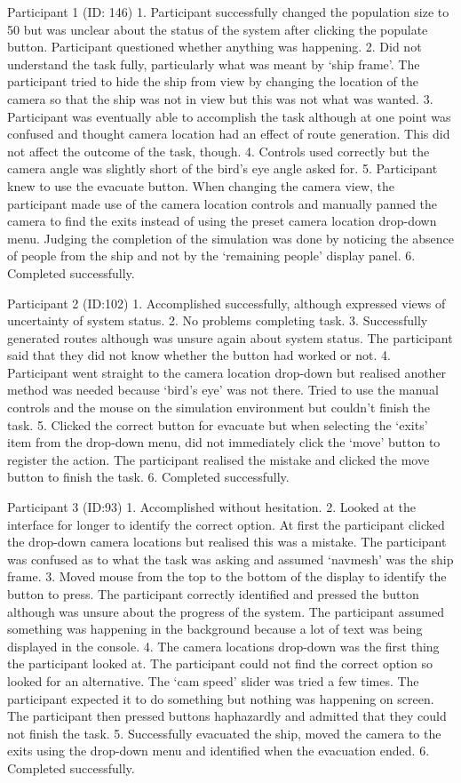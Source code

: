 \documentclass{article}
\begin{document}
Participant 1 (ID: 146)
1. Participant successfully changed the population size to 50 but was unclear about the status of the system after clicking the populate button. Participant questioned whether anything was happening.
2. Did not understand the task fully, particularly what was meant by ‘ship frame’. The participant tried to hide the ship from view by changing the location of the camera so that the ship was not in view but this was not what was wanted.
3. Participant was eventually able to accomplish the task although at one point was confused and thought camera location had an effect of route generation. This did not affect the outcome of the task, though.
4. Controls used correctly but the camera angle was slightly short of the bird’s eye angle asked for.
5. Participant knew to use the evacuate button. When changing the camera view, the participant made use of the camera location controls and manually panned the camera to find the exits instead of using the preset camera location drop-down menu. Judging the completion of the simulation was done by noticing the absence of people from the ship and not by the ‘remaining people’ display panel.
6. Completed successfully.

Participant 2 (ID:102)
1. Accomplished successfully, although expressed views of uncertainty of system status.
2. No problems completing task.
3. Successfully generated routes although was unsure again about system status. The participant said that they did not know whether the button had worked or not.
4. Participant went straight to the camera location drop-down but realised another method was needed because ‘bird’s eye’ was not there. Tried to use the manual controls and the mouse on the simulation environment but couldn’t finish the task.
5. Clicked the correct button for evacuate but when selecting the ‘exits’ item from the drop-down menu, did not immediately click the ‘move’ button to register the action. The participant realised the mistake and clicked the move button to finish the task.
6. Completed successfully.

Participant 3 (ID:93)
1. Accomplished without hesitation.
2. Looked at the interface for longer to identify the correct option. At first the participant clicked the drop-down camera locations but realised this was a mistake. The participant was confused as to what the task was asking and assumed ‘navmesh’ was the ship frame.
3. Moved mouse from the top to the bottom of the display to identify the button to press. The participant correctly identified and pressed the button although was unsure about the progress of the system. The participant assumed something was happening in the background because a lot of text was being displayed in the console.
4. The camera locations drop-down was the first thing the participant looked at. The participant could not find the correct option so looked for an alternative. The ‘cam speed’ slider was tried a few times. The participant expected it to do something but nothing was happening on screen. The participant then pressed buttons haphazardly and admitted that they could not finish the task.
5. Successfully evacuated the ship, moved the camera to the exits using the drop-down menu and identified when the evacuation ended.
6. Completed successfully.
\end{document}
